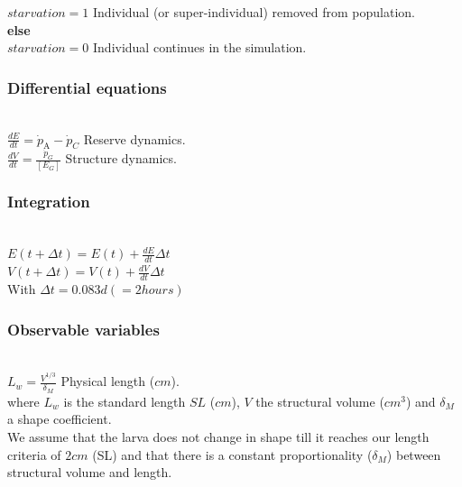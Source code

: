 $starvation = 1$ \hfill Individual (or super-individual) removed from population.\\

\textbf{else}\\

$starvation = 0$ \hfill Individual continues in the simulation.\\

\subsubsection{Differential equations}\label{Chap3DiffEq}
\hfill \\

$\frac{dE}{dt} = \dot{p}_\mathrm{A} - \dot{p}_{C}$ \hfill Reserve dynamics.\\

$\frac{dV}{dt} = \frac{\dot{p}_{G}}{\left[ E_{G} \right]}$ \hfill Structure dynamics.\\

\subsubsection{Integration}\label{Chap3Integ}
\hfill \\

$E\left ( t + \Delta t \right ) = E\left ( t \right ) + \frac{dE}{dt}\Delta t$ \\

$V\left ( t + \Delta t \right ) = V\left ( t \right ) + \frac{dV}{dt}\Delta t$ \\

With $\Delta t = 0.083 d \left (=2hours\right )$

\subsubsection{Observable variables}\label{Chap3ObsVar}
\hfill \\

$L_{w} = \frac{V^{1/3}}{\delta_{M}}$ \hfill Physical length ($cm$).\\

where $L_{w}$ is the standard length $SL$ ($cm$), $V$ the structural volume ($cm^3$) and $\delta_{M}$ a shape coefficient.\\

We assume that the larva does not change in shape till it reaches our length criteria of $2cm$ (SL) and that there is a constant proportionality ($\delta_{M}$) between structural volume and length.\\


